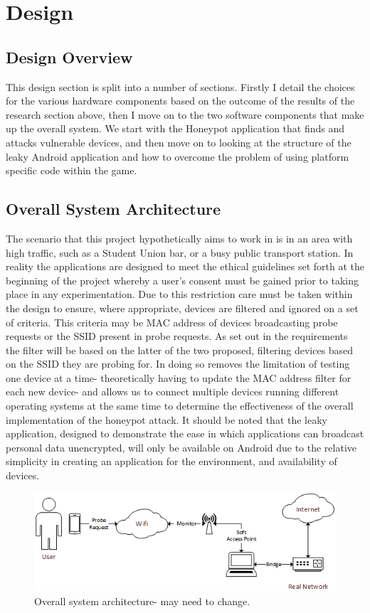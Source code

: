 \section{Design}
\subsection{Design Overview}
This design section is split into a number of sections. Firstly I detail the choices for the various hardware components based on the outcome of the results of the research section above, then I move on to the two software components that make up the overall system. We start with the Honeypot application that finds and attacks vulnerable devices, and then move on to looking at the structure of the leaky Android application and how to overcome the problem of using platform specific code within the game. 
\subsection{Overall System Architecture}
The scenario that this project hypothetically aims to work in is in an area with high traffic, such as a Student Union bar, or a busy public transport station. In reality the applications are designed to meet the ethical guidelines set forth at the beginning of the project whereby a user's consent must be gained prior to taking place in any experimentation. Due to this restriction care must be taken within the design to ensure, where appropriate, devices are filtered and ignored on a set of criteria. This criteria may be MAC address of devices broadcasting probe requests or the SSID present in probe requests. As set out in the requirements the filter will be based on the latter of the two proposed, filtering devices based on the SSID they are probing for. In doing so removes the limitation of testing one device at a time- theoretically having to update the MAC address filter for each new device- and allows us to connect multiple devices running different operating systems at the same time to determine the effectiveness of the overall implementation of the honeypot attack. It should be noted that the leaky application, designed to demonstrate the ease in which applications can broadcast personal data unencrypted, will only be available on Android due to the relative simplicity in creating an application for the environment, and availability of devices. 

\begin{figure}[h!]
\centering\includegraphics[width=\linewidth]{design/figures/overall.png}
\caption{Overall system architecture- may need to change.}
\end{figure}

